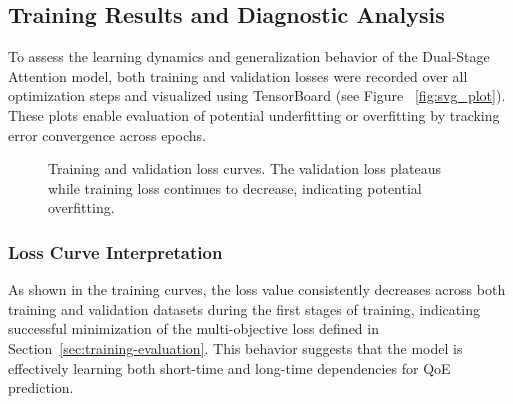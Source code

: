 \subsection{Training Results and Diagnostic Analysis}

To assess the learning dynamics and generalization behavior of the Dual-Stage Attention model, both training and validation losses were recorded over all optimization steps and visualized using TensorBoard (see Figure ~\ref{fig:svg_plot}). These plots enable evaluation of potential underfitting or overfitting by tracking error convergence across epochs.

\begin{figure}[htbp]
  \centering
  \caption{Training and validation loss curves. The validation loss plateaus while training loss continues to decrease, indicating potential overfitting.}
  \label{fig:loss_curves}
\end{figure}

\subsubsection{Loss Curve Interpretation}
As shown in the training curves, the loss value consistently decreases across both training and validation datasets during the first stages of training, indicating successful minimization of the multi-objective loss defined in Section~\ref{sec:training-evaluation}. This behavior suggests that the model is effectively learning both short-time and long-time dependencies for QoE prediction.

